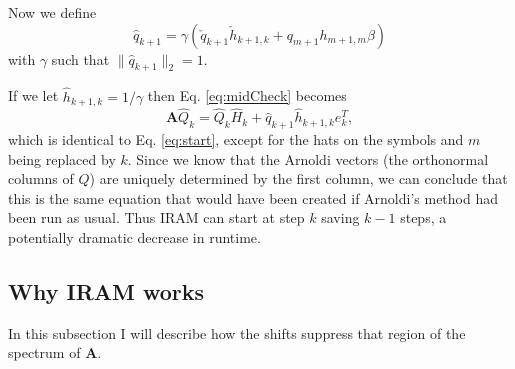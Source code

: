 \documentclass[12pt]{article}
\newcommand{\A}{\mathbf{A}}
\begin{document}
Now we define 
\begin{equation}
    \hat{q}_{k+1} = \gamma\left(\check{q}_{k+1}\check{h}_{k+1,k} + q_{m+1}h_{m+1,m}\beta\right)
\end{equation}
with $\gamma$ such that $\|\hat{q}_{k+1}\|_2 = 1$.

If we let $\hat{h}_{k+1,k} = 1/\gamma$ then Eq. \ref{eq:midCheck} becomes 
\begin{equation}
    \A \hat{Q}_k = \hat{Q}_k\hat{H}_k + \hat{q}_{k+1}\hat{h}_{k+1,k}e_k^T,
\end{equation}
which is identical to Eq. \ref{eq:start}, except for the hats on the symbols and $m$ being replaced by $k$.  Since we know that the Arnoldi vectors (the orthonormal columns of $Q$) are uniquely determined by the first column, we can conclude that this is the same equation that would have been created if Arnoldi's method had been run as usual.  Thus IRAM can start at step $k$ saving $k-1$ steps, a potentially dramatic decrease in runtime.

\subsection{Why IRAM works}
In this subsection I will describe how the shifts suppress that region of the spectrum of $\A$.
\end{document}
